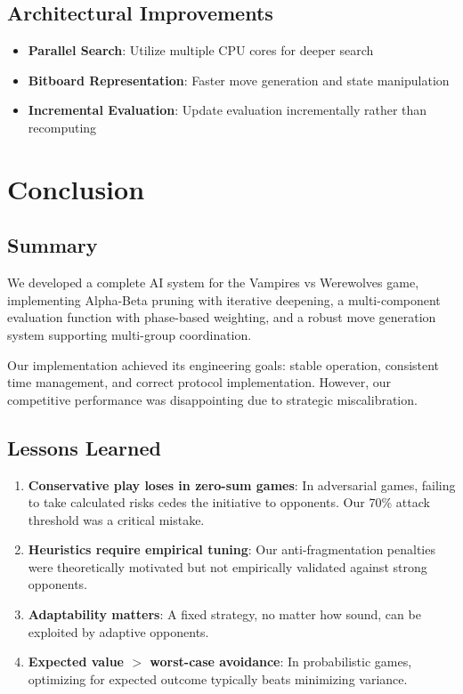\documentclass[11pt,a4paper]{article}
\begin{document}
\subsection{Architectural Improvements}

\begin{itemize}
    \item \textbf{Parallel Search}: Utilize multiple CPU cores for deeper search
    \item \textbf{Bitboard Representation}: Faster move generation and state manipulation
    \item \textbf{Incremental Evaluation}: Update evaluation incrementally rather than recomputing
\end{itemize}

\section{Conclusion}

\subsection{Summary}

We developed a complete AI system for the Vampires vs Werewolves game, implementing Alpha-Beta pruning with iterative deepening, a multi-component evaluation function with phase-based weighting, and a robust move generation system supporting multi-group coordination.

Our implementation achieved its engineering goals: stable operation, consistent time management, and correct protocol implementation. However, our competitive performance was disappointing due to strategic miscalibration.

\subsection{Lessons Learned}

\begin{enumerate}
    \item \textbf{Conservative play loses in zero-sum games}: In adversarial games, failing to take calculated risks cedes the initiative to opponents. Our 70\% attack threshold was a critical mistake.

    \item \textbf{Heuristics require empirical tuning}: Our anti-fragmentation penalties were theoretically motivated but not empirically validated against strong opponents.

    \item \textbf{Adaptability matters}: A fixed strategy, no matter how sound, can be exploited by adaptive opponents.

    \item \textbf{Expected value $>$ worst-case avoidance}: In probabilistic games, optimizing for expected outcome typically beats minimizing variance.
\end{enumerate}
\end{document}
